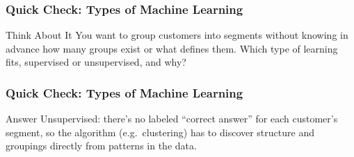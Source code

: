 %
%
%
%

\begin{frame}[fragile]\frametitle{Quick Check: Types of Machine Learning}
\begin{block}{Think About It}
You want to group customers into segments without knowing in advance how many groups exist or what defines them. Which type of learning fits, supervised or unsupervised, and why?
\end{block}
\end{frame}

\begin{frame}[fragile]\frametitle{Quick Check: Types of Machine Learning}
\begin{block}{Answer}
Unsupervised: there's no labeled ``correct answer'' for each customer's segment, so the algorithm (e.g.\ clustering) has to discover structure and groupings directly from patterns in the data.
\end{block}
\end{frame}






